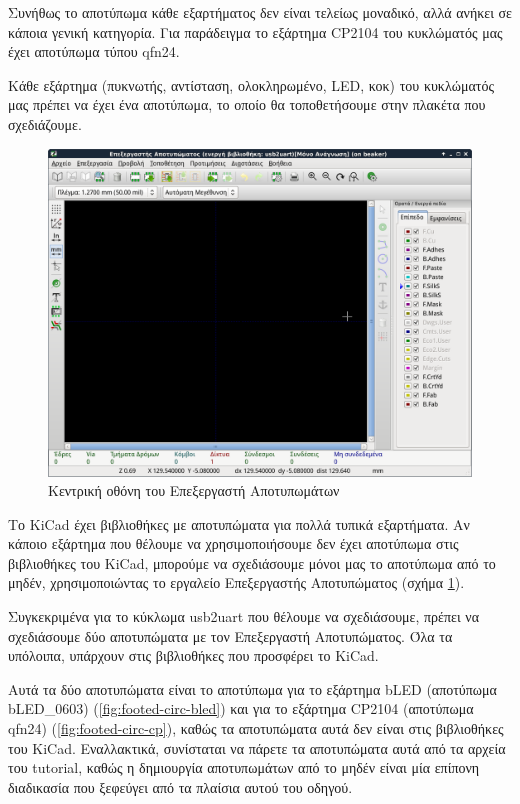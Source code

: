 \documentclass[a4paper]{article}
\begin{document}
Συνήθως το αποτύπωμα κάθε εξαρτήματος δεν είναι τελείως μοναδικό, αλλά ανήκει σε κάποια γενική κατηγορία. Για παράδειγμα το εξάρτημα CP2104 του κυκλώματός μας έχει αποτύπωμα τύπου qfn24.

Κάθε εξάρτημα (πυκνωτής, αντίσταση, ολοκληρωμένο, LED, κοκ) του κυκλώματός μας πρέπει να έχει ένα αποτύπωμα, το οποίο θα τοποθετήσουμε στην πλακέτα που σχεδιάζουμε.

\begin{figure}
  \begin{center}
    \includegraphics[width=.9\textwidth]{img/footed-main-wind.png}
    \caption{Κεντρική οθόνη του Επεξεργαστή Αποτυπωμάτων}
    \label{fig:footed-main-wind}
  \end{center}
\end{figure}

Το \textenglish{KiCad} έχει βιβλιοθήκες με αποτυπώματα για πολλά τυπικά εξαρτήματα. Αν κάποιο εξάρτημα που θέλουμε να χρησιμοποιήσουμε δεν έχει αποτύπωμα στις βιβλιοθήκες του \textenglish{KiCad}, μπορούμε να σχεδιάσουμε μόνοι μας το αποτύπωμα από το μηδέν, χρησιμοποιώντας το εργαλείο Επεξεργαστής Αποτυπώματος (σχήμα \ref{fig:footed-main-wind}).

Συγκεκριμένα για το κύκλωμα usb2uart που θέλουμε να σχεδιάσουμε, πρέπει να σχεδιάσουμε δύο αποτυπώματα με τον Επεξεργαστή Αποτυπώματος. Όλα τα υπόλοιπα, υπάρχουν στις βιβλιοθήκες που προσφέρει το KiCad.

Αυτά τα δύο αποτυπώματα είναι το αποτύπωμα για το εξάρτημα bLED (αποτύπωμα bLED\_0603) (\ref{fig:footed-circ-bled}) και για το εξάρτημα CP2104 (αποτύπωμα qfn24) (\ref{fig:footed-circ-cp}), καθώς τα αποτυπώματα αυτά δεν είναι στις βιβλιοθήκες του \textenglish{KiCad}. Εναλλακτικά, συνίσταται να πάρετε τα αποτυπώματα αυτά από τα αρχεία του tutorial, καθώς η δημιουργία αποτυπωμάτων από το μηδέν είναι μία επίπονη διαδικασία που ξεφεύγει από τα πλαίσια αυτού του οδηγού. 
\end{document}
